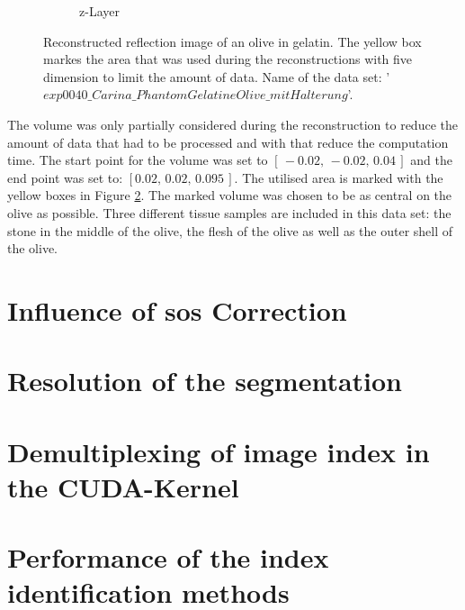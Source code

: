 \begin{figure}[H]
\begin{subfigure}[b]{0.55\textwidth}
         \caption{z-Layer}
         \label{fig:res:reflec_image_olive_xyz_z}
     \end{subfigure}
        \caption{Reconstructed reflection image of an olive in gelatin. The yellow box markes the area that was used during the reconstructions with five dimension to limit the amount of data.
        Name of the data set: '$exp0040\_Carina\_PhantomGelatineOlive\_mitHalterung$'.}
        \label{fig:res:reflec_image_olive_xyz}
\end{figure}

The volume was only partially considered during the reconstruction to reduce the amount of data that had to be processed and with that reduce the computation time. The start point for the volume was set to $[\, -0.02,\, -0.02,\, 0.04\, ]$ and the end point was set to: $[ 0.02,\, 0.02,\, 0.095\, ]$. The utilised area is marked with the yellow boxes in Figure \ref{fig:res:reflec_image_olive_xyz}. The marked volume was chosen to be as central on the olive as possible. Three different tissue samples are included in this data set: the stone in the middle of the olive, the flesh of the olive as well as the outer shell of the olive. 
      
      
\section{Influence of \ac{sos} Correction }

\section{Resolution of the segmentation}


\section{Demultiplexing of image index in the CUDA-Kernel}
\label{demultiplexing_structure}




\section{Performance of the index identification methods}
\label{performance_index_ident}


